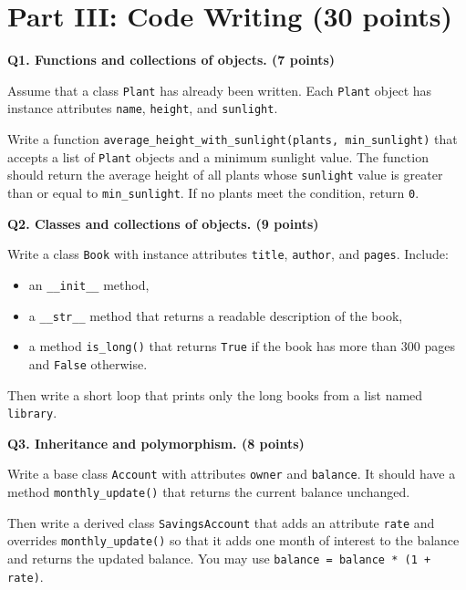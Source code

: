 \documentclass[12pt]{article}
\begin{document}
\newpage
\section*{Part III: Code Writing (30 points)}

\textbf{Q1. Functions and collections of objects. (7 points)}

Assume that a class \texttt{Plant} has already been written. Each \texttt{Plant} object has instance attributes \texttt{name}, \texttt{height}, and \texttt{sunlight}.

Write a function \texttt{average\_height\_with\_sunlight(plants, min\_sunlight)} that accepts a list of \texttt{Plant} objects and a minimum sunlight value. The function should return the average height of all plants whose \texttt{sunlight} value is greater than or equal to \texttt{min\_sunlight}. If no plants meet the condition, return \texttt{0}.

\vspace{3.0in}
\newpage

\textbf{Q2. Classes and collections of objects. (9 points)}

Write a class \texttt{Book} with instance attributes \texttt{title}, \texttt{author}, and \texttt{pages}. Include:

\begin{itemize}
\item an \texttt{\_\_init\_\_} method,
\item a \texttt{\_\_str\_\_} method that returns a readable description of the book,
\item a method \texttt{is\_long()} that returns \texttt{True} if the book has more than 300 pages and \texttt{False} otherwise.
\end{itemize}

Then write a short loop that prints only the long books from a list named \texttt{library}.

\vspace{3.4in}
\newpage

\textbf{Q3. Inheritance and polymorphism. (8 points)}

Write a base class \texttt{Account} with attributes \texttt{owner} and \texttt{balance}. It should have a method \texttt{monthly\_update()} that returns the current balance unchanged.

Then write a derived class \texttt{SavingsAccount} that adds an attribute \texttt{rate} and overrides \texttt{monthly\_update()} so that it adds one month of interest to the balance and returns the updated balance. You may use \texttt{balance = balance * (1 + rate)}.
\end{document}
